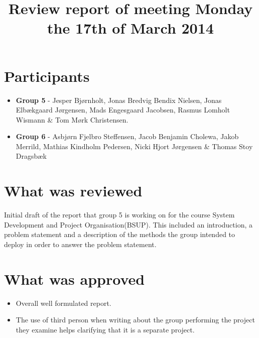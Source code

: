 \documentclass[]{article}
\title{Review report of meeting Monday the 17th of March 2014}
\begin{document}
\maketitle


\section*{Participants}
\begin{itemize}
\item \textbf{Group 5} - Jesper Bj\o rnholt, Jonas Bredvig Bendix Nielsen, Jonas Elb\ae kgaard J\o rgensen, Mads Engesgaard Jacobsen, Rasmus Lomholt Wismann \& Tom M\o rk Christensen.
\item \textbf{Group 6} - Asbj\o rn Fjelbro Steffensen, Jacob Benjamin Cholewa, Jakob Merrild, Mathias Kindholm Pedersen, Nicki Hjort J\o rgensen \& Thomas Stoy Dragsb\ae k
\end{itemize}
\section*{What was reviewed}
Initial draft of the report that group 5 is working on for the course System Development and Project Organisation(BSUP). This included an introduction, a problem statement and a description of the methods the group intended to deploy in order to answer the problem statement.
\section*{What was approved}
\begin{itemize}
\item Overall well formulated report.
\item The use of third person when writing about the group performing the project they examine helps clarifying that it is a separate project.
\end{itemize}
\end{document}
